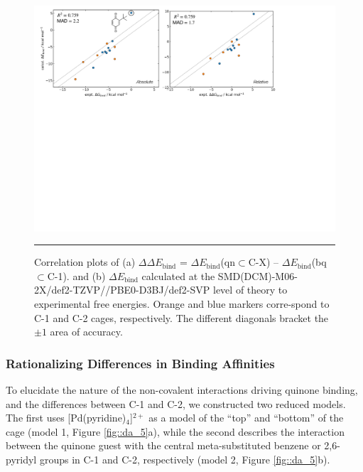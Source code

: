\documentclass[../../main.tex]{subfiles}
\begin{document}
\begin{figure}[h!]
	\vspace{0.4cm}
	\centering
	\includegraphics[width=\textwidth]{3/da/figs/fig4/fig4.pdf}
	\vspace{0.2cm}
	\hrule
	\caption{Correlation plots of (a) $\Delta\Delta E_\text{bind}$ = $\Delta E_\text{bind}$(qn$\subset$C-X) – $\Delta E_\text{bind}$(bq$\subset$C-1). and (b) $\Delta E_\text{bind}$ calculated at the SMD(DCM)-M06-2X/def2-TZVP//PBE0-D3BJ/def2-SVP level of theory to experimental free energies. Orange and blue markers corre-spond to C-1 and C-2 cages, respectively. The different diagonals bracket the $\pm1$ \kcalx area of accuracy.}
	\label{fig::da_4}
\end{figure}


\subsubsection{Rationalizing Differences in Binding Affinities}
To elucidate the nature of the non-covalent interactions driving quinone binding, and the differences between C-1 and C-2, we constructed two reduced models. The first uses [Pd(pyridine)${}_4$]${}^{2+}$ as a model of the “top” and “bottom” of the cage (model 1, Figure \ref{fig::da_5}a), while the second describes the interaction between the quinone guest with the central meta-substituted benzene or 2,6-pyridyl groups in C-1 and C-2, respectively (model 2, Figure \ref{fig::da_5}b). 
\end{document}
